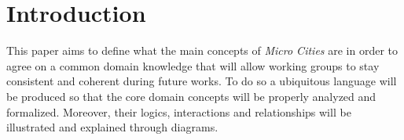 \section*{Introduction}
\label{sec:introduction}

This paper aims to define what the main concepts of \textit{Micro Cities} are in order to agree on a common domain knowledge that will allow working groups to stay consistent and coherent during future works.
To do so a ubiquitous language will be produced so that the core domain concepts will be properly analyzed and formalized.
Moreover, their logics, interactions and relationships will be illustrated and explained through diagrams.
